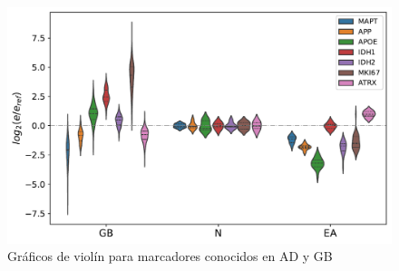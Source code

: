 
\chapter{}\label{apx:apx2}

\begin{figure}[!htb]
	\centering
	\includegraphics[width=\linewidth]{figures/suppl2}
	\caption{Gráficos de violín para marcadores conocidos en AD y GB}
	\label{fig:apx2}
\end{figure}